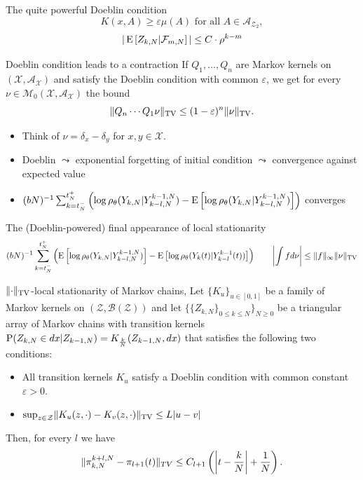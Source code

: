 \begin{frame}{The quite powerful Doeblin condition}
	\small \[
	K(x,A) \geq \varepsilon \mu(A) \text{ for all } A \in \mathcal{A}_{\mathcal{Z}_2},
	\]
	\[
	|\E[Z_{k,N}|\mathcal{F}_{m,N}]| \leq C \cdot \rho^{k-m}
	\]
	\pause
	\normalsize
	\begin{propositionblockname}{Doeblin condition leads to a contraction}
		If $Q_1, \ldots, Q_n$ are Markov kernels on $(\mathcal{X}, \mathcal{A}_\mathcal{X})$ and satisfy the Doeblin condition with common $\varepsilon$, we get for every $\nu \in \mathcal{M}_0(\mathcal{X}, \mathcal{A}_\mathcal{X})$ the  bound \[
		\norm{Q_n \cdots Q_1 \nu}_{\text{TV}} \leq (1-\varepsilon)^n \norm{\nu}_{\text{TV}}.
		\]
	\end{propositionblockname}
	\begin{itemize}
		\item Think of $\nu = \delta_x - \delta_y$ for $x,y \in \mathcal{X}$.
		\item Doeblin $\leadsto$ exponential forgetting of initial condition $\leadsto$ convergence against expected value
		\pause
		\item $(bN)^{-1} \sum_{k=t_N^-}^{t_N^+} \left(\log \rho_\theta(Y_{k,N}|Y_{k-l,N}^{k-1,N})-  \E[\log \rho_\theta(Y_{k,N}|Y_{k-l,N}^{k-1,N})]\right)$ converges
	\end{itemize}
\end{frame}

\begin{frame}{The (Doeblin-powered) final appearance of local stationarity}
	\vspace{-0.5cm}
	\textcolor{red}{
	\tiny 
	\[(bN)^{-1} \sum_{k=t_N^-}^{t_N^+} \left(\E[\log \rho_\theta(Y_{k,N}|Y_{k-l,N}^{k-1,N})]-  \E[\log \rho_\theta(Y_{k}(t)|Y_{k-l}^{k-1}(t))]\right) \qquad  \left|\int f d\nu\right| \leq \norm{f}_\infty \norm{\nu}_{\text{TV}}
	\]}
	\small
	\begin{theoremblockname}{$\norm{\cdot}_{\text{TV}}$-local stationarity of Markov chains, \cite{truquet2019locally}}
	Let $\{K_u\}_{u \in [0,1]}$ be a family of Markov kernels on $(\mathcal{Z}, \mathcal{B}(\mathcal{Z}))$ and let $\{\{Z_{k,N}\}_{0 \leq k \leq N}\}_{N \geq 0}$ be a triangular array of Markov chains with transition kernels $\P(Z_{k,N} \in dx | Z_{k-1,N}) = K_{\frac{k}{N}}(Z_{k-1,N}, dx)$ that satisfies the following two conditions: \begin{itemize}
		\item[(A1)] All transition kernels $K_u$ satisfy a Doeblin condition with common constant $\varepsilon > 0$. 
		\item[(A2)] $\sup_{z \in \mathcal{Z}} \norm{K_u(z,\cdot) - K_v(z,\cdot)}_{\text{TV}} \leq L|u-v|$
	\end{itemize}
	Then, for every $l$ we have \vspace{-0.3cm}\[
	 \norm{\pi_{k,N}^{k+l,N} - \pi_{l+1}(t)}_{TV} \leq C_{l+1} \left(\left|t- \frac{k}{N}\right| + \frac{1}{N}\right). 
	\]
	\end{theoremblockname}
\end{frame}

